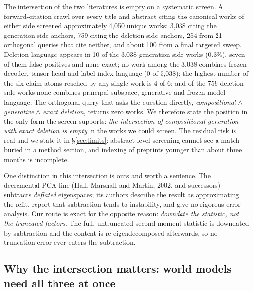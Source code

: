 \documentclass{article}
\begin{document}
The intersection of the two literatures is empty on a systematic screen. A forward-citation
crawl over every title and abstract citing the canonical works of either side screened
approximately 4,050 unique works: 3,038 citing the generation-side anchors, 759 citing the
deletion-side anchors, 254 from 21 orthogonal queries that cite neither, and about 100 from
a final targeted sweep.
Deletion language appears in 10 of the 3,038 generation-side works (0.3\%), seven of them
false positives and none exact; no work among the 3,038 combines frozen-decoder,
tensor-head and label-index language (0 of 3,038); the highest number of the six claim
atoms reached by any single work is 4 of 6; and of the 759 deletion-side works none combines
principal-subspace, generative and frozen-model language.
The orthogonal query that asks the question directly, \emph{compositional} $\wedge$
\emph{generative} $\wedge$ \emph{exact deletion}, returns zero works.
We therefore state the position in the only form the screen supports: \emph{the intersection
of compositional generation with exact deletion is empty} in the works we could screen.
The residual risk is real and we state it in \S\ref{sec:limits}: abstract-level screening
cannot see a match buried in a method section, and indexing of preprints younger than about
three months is incomplete.

One distinction in this intersection is ours and worth a sentence. The decremental-PCA line
(Hall, Marshall and Martin, 2002, and successors) subtracts \emph{deflated} eigenspaces; its
authors describe the result as approximating the refit, report that subtraction tends to
instability, and give no rigorous error analysis. Our route is exact for the opposite reason:
\emph{downdate the statistic, not the truncated factors}. The full, untruncated second-moment
statistic is downdated by subtraction and the content is re-eigendecomposed afterwards, so no
truncation error ever enters the subtraction.

\subsection{Why the intersection matters: world models need all three at once}
\label{sec:why}
\end{document}
